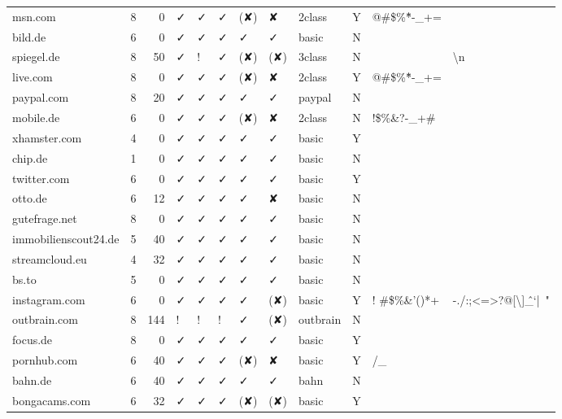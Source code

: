 {\begin{longtable}{lrrlllllllp{1cm}p{1cm}}
		msn.com & 8     & 0     & ✓ & ✓ & ✓ & (✘) & ✘ & 2class & Y     & \multicolumn{1}{l}{@\#\$\%\^*-\_+=} &  \\
		bild.de & 6     & 0     & ✓ & ✓ & ✓ & ✓ & ✓ & basic & N     &       &  \\
		spiegel.de & 8     & 50    & ✓ & ! & ✓ & (✘) & (✘) & 3class & N     &       & \multicolumn{1}{l}{ \textbackslash{}n} \\
		live.com & 8     & 0     & ✓ & ✓ & ✓ & (✘) & ✘ & 2class & Y     & \multicolumn{1}{l}{@\#\$\%\^*-\_+=} &  \\
		paypal.com & 8     & 20    & ✓ & ✓ & ✓ & ✓ & ✓ & paypal & N     &       &  \\
		mobile.de & 6     & 0     & ✓ & ✓ & ✓ & (✘) & ✘ & 2class & N     & \multicolumn{1}{l}{!\$\%\&?-\_+\#} &  \\
		xhamster.com & 4     & 0     & ✓ & ✓ & ✓ & ✓ & ✓ & basic & Y     &       &  \\
		chip.de & 1     & 0     & ✓ & ✓ & ✓ & ✓ & ✓ & basic & N     &       &  \\
		twitter.com & 6     & 0     & ✓ & ✓ & ✓ & ✓ & ✓ & basic & Y     &       &  \\
		otto.de & 6     & 12    & ✓ & ✓ & ✓ & ✓ & ✘ & basic & N     &       &  \\
		gutefrage.net & 8     & 0     & ✓ & ✓ & ✓ & ✓ & ✓ & basic & N     &       &  \\
		immobilienscout24.de & 5     & 40    & ✓ & ✓ & ✓ & ✓ & ✓ & basic & N     &       &  \\
		streamcloud.eu & 4     & 32    & ✓ & ✓ & ✓ & ✓ & ✓ & basic & N     &       &  \\
		bs.to & 5     & 0     & ✓ & ✓ & ✓ & ✓ & ✓ & basic & N     &       &  \\
		instagram.com & 6     & 0     & ✓ & ✓ & ✓ & ✓ & (✘) & basic & Y     & \multicolumn{1}{l}{! \#\$\%\&'()*+} & \multicolumn{1}{l}{-./:;<=>?@[\textbackslash{}]\^\_`{|}~"} \\
		outbrain.com & 8     & 144   & ! & ! & ! & ✓ & (✘) & outbrain & N     &       & \multicolumn{1}{l}{ } \\
		focus.de & 8     & 0     & ✓ & ✓ & ✓ & ✓ & ✓ & basic & Y     &       &  \\
		pornhub.com & 6     & 40    & ✓ & ✓ & ✓ & (✘) & ✘ & basic & Y     & \multicolumn{1}{l}{/\_} &  \\
		bahn.de & 6     & 40    & ✓ & ✓ & ✓ & ✓ & ✓ & bahn  & N     &       &  \\
		bongacams.com & 6     & 32    & ✓ & ✓ & ✓ & (✘) & (✘) & basic & Y     &       &  \\

\end{longtable}}
